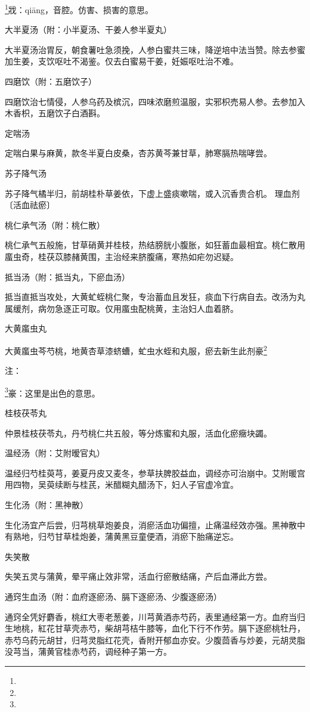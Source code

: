 \documentclass[a4paper,12pt,UTF8,twoside]{ctexbook}
\begin{document}
\footnote{}戕：qiāng，音腔。仿害、损害的意思。

大半夏汤（附：小半夏汤、干姜人参半夏丸）

大半夏汤治胃反，朝食薯吐急须挽，人参白蜜共三味，降逆培中法当赞。除去参蜜加生姜，支饮呕吐不渴鉴。仅去白蜜易干姜，妊娠呕吐治不难。

四磨饮（附：五磨饮子）

四磨饮治七情侵，人参乌药及槟沉，四味浓磨煎温服，实邪枳売易人参。去参加入木香枳，五磨饮子白酒斟。

定喘汤

定喘白果与麻黄，款冬半夏白皮桑，杏苏黄芩兼甘草，肺寒膈热喘哮尝。

苏子降气汤

苏子降气橘半归，前胡桂朴草姜依，下虚上盛痰嗽喘，或入沉香贵合机。
理血剂
〔活血祛瘀〕

桃仁承气汤（附：桃仁散）

桃仁承气五般施，甘草硝黄并桂枝，热结膀胱小腹胀，如狂蓄血最相宜。桃仁散用䗪虫奇，桂茯苡膝赭黄围，主治经来脐腹痛，寒热如疟勿迟疑。

抵当汤（附：抵当丸，下瘀血汤）

抵当直抵当攻处，大黄虻蛭桃仁聚，专治蓄血且发狂，痰血下行病自去。改汤为丸属缓剂，病勿急逐正可取。仅用䗪虫配桃黄，主治妇人血着脐。

大黄䗪虫丸

大黄䗪虫芩芍桃，地黄杏草漆蛴螬，虻虫水蛭和丸服，瘀去新生此剂豪\footnote{}

注：

\footnote{}豪：这里是出色的意思。

桂枝茯苓丸

仲景桂枝茯苓丸，丹芍桃仁共五般，等分炼蜜和丸服，活血化瘀癥块蠲。

温经汤（附：艾附暧官丸）

温经归芍桂萸芎，姜夏丹皮又麦冬，参草扶脾胶益血，调经亦可治崩中。艾附暖宫用四物，吴萸续断与桂芪，米醋糊丸醋汤下，妇人子官虚冷宜。

生化汤（附：黑神散）

生化汤宜产后尝，归芎桃草炮姜良，消瘀活血功偏擅，止痛温经效亦强。黑神散中有熟地，归芍甘草桂炮姜，蒲黄黑豆童便酒，消瘀下胎痛逆忘。

失笑散

失笑五灵与蒲黄，晕平痛止效非常，活血行瘀散结痛，产后血滞此方尝。

通窍生血汤（附：血府逐瘀汤、膈下逐瘀汤、少腹逐瘀汤）

通窍全凭好麝香，桃红大枣老葱姜，川芎黄酒赤芍药，表里通经第一方。血府当归生地桃，紅花甘草壳赤芍，柴胡芎桔牛膝等，血化下行不作劳。膈下逐瘀桃牡丹，赤芍乌药元胡甘，归芎灵脂红花壳，香附开郁血亦安。少腹茴香与炒姜，元胡灵脂没芎当，蒲黄官桂赤芍药，调经种子第一方。
\end{document}
